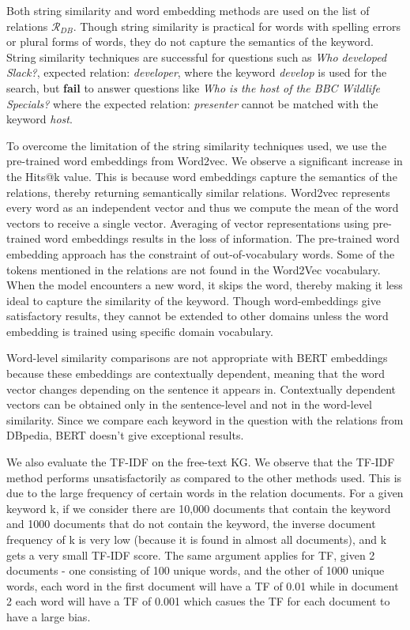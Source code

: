 Both string similarity and word embedding methods are used on the list of relations $\mathcal{R}_{DB}$. Though string similarity is practical for words with spelling errors or plural forms of words, they do not capture the semantics of the keyword. String similarity techniques are successful for questions such as \textit{Who developed Slack?}, expected relation: \textit{developer}, where the keyword \textit{develop} is used for the search,
but \textbf{fail} to answer questions like \textit{Who is the host of the BBC Wildlife Specials?} where the expected relation: \textit{presenter} cannot be matched with the keyword \textit{host}. 

To overcome the limitation of the string similarity techniques used, we use the pre-trained word embeddings from Word2vec. We observe a significant increase in the Hits@k value. This is because word embeddings capture the semantics of the relations, thereby returning semantically similar relations. Word2vec represents every word as an independent vector and thus we compute the mean of the word vectors to receive a single vector. Averaging of vector representations using pre-trained word embeddings results in the loss of information. The pre-trained word embedding approach has the constraint of out-of-vocabulary words. Some of the tokens mentioned in the relations are not found in the Word2Vec vocabulary. When the model encounters a new word, it skips the word, thereby making it less ideal to capture the similarity of the keyword. Though word-embeddings give satisfactory results, they cannot be extended to other domains unless the word embedding is trained using specific domain vocabulary.

Word-level similarity comparisons are not appropriate with BERT embeddings because these embeddings are contextually dependent, meaning that the word vector changes depending on the sentence it appears in. Contextually dependent vectors can be obtained only in the sentence-level and not in the word-level similarity. Since we compare each keyword in the question with the relations from DBpedia, BERT doesn't give exceptional results. 

We also evaluate the TF-IDF on the free-text KG. We observe that the TF-IDF method performs unsatisfactorily as compared to the other methods used. This is due to the large frequency of certain words in the relation documents. For a given keyword k, if we consider there are 10,000 documents that contain the keyword and 1000 documents that do not contain the keyword, the inverse document frequency of k is very low (because it is found in almost all documents), and k gets a very small TF-IDF score. The same argument applies for TF, given 2 documents - one consisting of 100 unique words, and the other of 1000 unique words, each word in the first document will have a TF of 0.01 while in document 2 each word will have a TF of 0.001 which casues the TF for each document to have a large bias.

